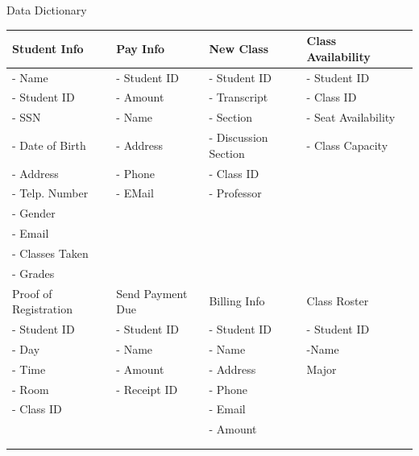 \documentclass{article}
\begin{document}
\tableofcontents
\newpage
\begin{section}{Data Dictionary}
\begin{center}
    \begin{tabular}{ | l | l | l |l| p{5cm} |}
   \hline
    Student Info & Pay Info & New Class & Class Availability \\ \hline

    

    
    - Name          &  - Student ID &  - Student ID           & - Student ID  \\
    - Student ID    &  - Amount     &  - Transcript           & - Class ID  \\ 
    - SSN           &  - Name       &  - Section              & - Seat Availability\\ 
    - Date of Birth &  - Address    &  - Discussion Section   & - Class Capacity   \\ 
    - Address       &  - Phone      &  - Class ID             &   \\ 
    - Telp. Number  &  - EMail      &  - Professor            &   \\ 
    - Gender        &               &                         &   \\ 
    - Email         &               &                         &   \\ 
    - Classes Taken &               &                         &   \\ 
    - Grades        &               &                         &\\ \hline

    
       
    
Proof of Registration & Send Payment Due & Billing Info & Class Roster\\ \hline
       - Student ID   &  - Student ID    &  - Student ID& - Student ID  \\ 
       - Day          &  - Name          &  - Name      & -Name\\
       - Time         &  - Amount        &  - Address   & Major   \\ 
       - Room         &  - Receipt ID    &  - Phone     &   \\ 
       - Class ID     &                  &    - Email   & \\ 
                      &                  &    - Amount  & \\
                      &                  &              &   \\ 
                      &                  &               &\\ \hline
    
    
    
    
    
    
    
    
    
    \hline
    \end{tabular}
\end{center}
\end{section}
\end{document}
